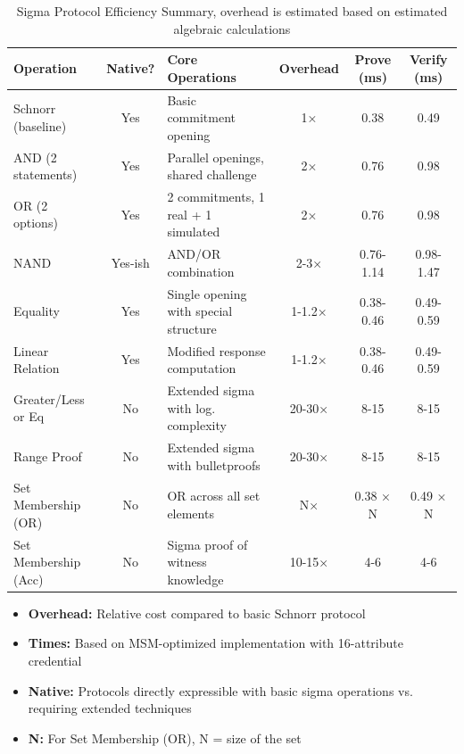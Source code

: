 \begin{table}[!htb]
\centering
\caption{Sigma Protocol Efficiency Summary, overhead is estimated based on estimated algebraic calculations}\label{tab:sigma_protocol_efficiency_compare}
\begin{tabular}{l|c|l|c|c|c}
\hline
\textbf{Operation} & \textbf{Native?} & \textbf{Core Operations} & \textbf{Overhead} & \textbf{Prove (ms)} & \textbf{Verify (ms)} \\
\hline
Schnorr (baseline) & Yes & Basic commitment opening & 1× & 0.38 & 0.49 \\
AND (2 statements) & Yes & Parallel openings, shared challenge & 2× & 0.76 & 0.98 \\
OR (2 options) & Yes & 2 commitments, 1 real + 1 simulated & 2× & 0.76 & 0.98 \\
NAND & Yes-ish & AND/OR combination & 2-3× & 0.76-1.14 & 0.98-1.47 \\
Equality & Yes & Single opening with special structure & 1-1.2× & 0.38-0.46 & 0.49-0.59 \\
Linear Relation & Yes & Modified response computation & 1-1.2× & 0.38-0.46 & 0.49-0.59 \\
Greater/Less or Eq & No & Extended sigma with log. complexity & 20-30× & 8-15 & 8-15 \\
Range Proof & No & Extended sigma with bulletproofs & 20-30× & 8-15 & 8-15 \\
Set Membership (OR) & No & OR across all set elements & N× & 0.38 × N & 0.49 × N \\
Set Membership (Acc) & No & Sigma proof of witness knowledge & 10-15× & 4-6 & 4-6 \\
\hline
\end{tabular}

\begin{itemize}
\item \textbf{Overhead:} Relative cost compared to basic Schnorr protocol
\item \textbf{Times:} Based on MSM-optimized implementation with 16-attribute credential
\item \textbf{Native:} Protocols directly expressible with basic sigma operations vs. requiring extended techniques
\item \textbf{N:} For Set Membership (OR), N = size of the set
\end{itemize}
\end{table}

